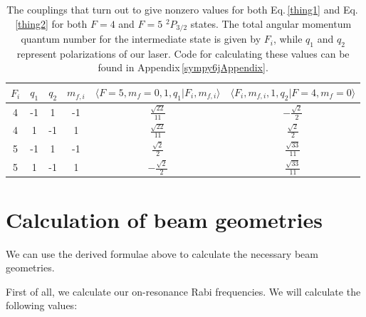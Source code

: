 \begin{table}[h!]
\centering
\begin{tabular}{|c|c|c|c|c|c|}
\hline
$F_i$ & $q_1$ & $q_2$ & $m_{f,i}$&$\langle F=5,m_f=0,1,q_1|F_i,m_{f,i}\rangle$&$\langle F_i,m_{f,i},1,q_2|F=4,m_f=0 \rangle$\\
\hline
4 & -1 & 1 & -1 &$ \frac{\sqrt{22}}{11} $&$ - \frac{\sqrt{2}}{2} $ \\ 
4 & 1 & -1 & 1 &$ \frac{\sqrt{22}}{11} $&$ \frac{\sqrt{2}}{2} $ \\ 
5 & -1 & 1 & -1 &$ \frac{\sqrt{2}}{2} $&$ \frac{\sqrt{33}}{11} $ \\ 
5 & 1 & -1 & 1 &$ - \frac{\sqrt{2}}{2} $&$ \frac{\sqrt{33}}{11} $ \\
\hline
\end{tabular}
\caption{The couplings that turn out to give nonzero values for both Eq.\,\eqref{thing1} and Eq.\,\eqref{thing2} for both $F=4$ and $F=5$ $^2P_{3/2}$ states. The total angular momentum quantum number for the intermediate state is given by $F_i$, while $q_1$ and $q_2$ represent polarizations of our laser. Code for calculating these values can be found in Appendix\,\ref{sympy6jAppendix}.}
\label{nonzeroCG}
\end{table}

\section{Calculation of beam geometries}
We can use the derived formulae above to calculate the necessary beam geometries. %

First of all, we calculate our on-resonance Rabi frequencies. We will calculate the following values:

